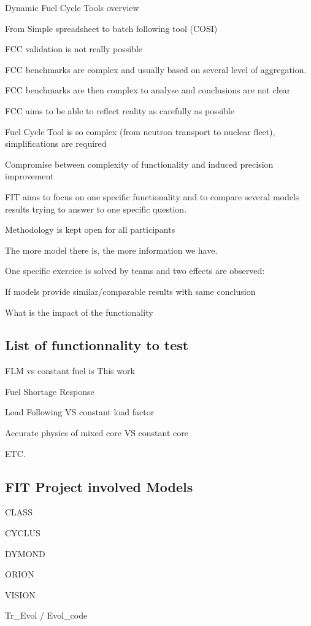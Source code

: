 \documentclass[review]{elsarticle}
\begin{document}
Dynamic Fuel Cycle Tools overview

From Simple spreadsheet to batch following tool (COSI)

FCC validation is not really possible

FCC benchmarks are complex and usually based on several level of aggregation. 

FCC benchmarks are then complex to analyse and conclusions are not clear

FCC aims to be able to reflect reality as carefully as possible

Fuel Cycle Tool is so complex (from neutron transport to nuclear fleet), simplifications are required

Compromise between complexity of functionality and induced precision improvement

FIT aims to focus on one specific functionality and to compare several models results trying to answer to one specific question. 

Methodology is kept open for all participants

The more model there is, the more information we have.

One specific exercice is solved by teams and two effects are observed:

If models provide similar/comparable results with same conclusion

What is the impact of the functionality 

\subsection{List of functionnality to test}

FLM vs constant fuel is This work

Fuel Shortage Response

Load Following VS constant load factor

Accurate physics of mixed core VS constant core

ETC.

\subsection{FIT Project involved Models}


CLASS

CYCLUS

DYMOND

ORION

VISION

Tr\_Evol / Evol\_code
\end{document}
